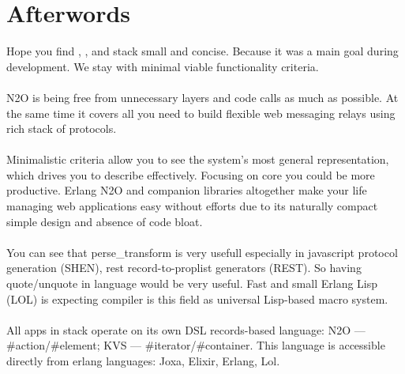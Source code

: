 
\begingroup
\section{Afterwords}

Hope you find ,
, and
 stack small and concise.
Because it was a main goal during development.
We stay with minimal viable functionality criteria.

\paragraph{}
N2O is being free from unnecessary layers and code calls as much as possible.
At the same time it covers all you need to build
flexible web messaging relays using rich stack of protocols.

\paragraph{}
Minimalistic criteria allow you to see the system's
most general representation, which drives you to describe effectively.
Focusing on core you could be more productive.
Erlang N2O and companion libraries altogether make
your life managing web applications easy without
efforts due to its naturally compact simple design and absence of code bloat.

\paragraph{}
You can see that perse\_transform is very usefull especially in javascript
protocol generation (SHEN), rest record-to-proplist generators (REST). So having
quote/unquote in language would be very useful. Fast and small
Erlang Lisp (LOL) is expecting compiler is this field as universal
Lisp-based macro system.

\paragraph{}
All apps in stack operate on its own DSL
records-based language: N2O --- \#action/\#element; KVS --- \#iterator/\#container.
This language is accessible directly from erlang languages: Joxa, Elixir, Erlang, Lol.

\endgroup
